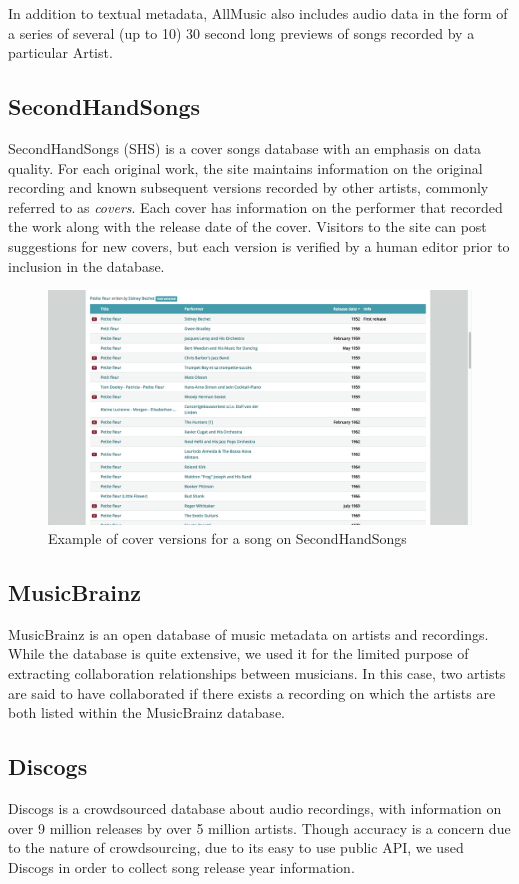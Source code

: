 In addition to textual metadata, AllMusic also includes audio data in the form of a series of several (up to 10) 30 second long previews of songs recorded by a particular Artist. 

\subsection{SecondHandSongs}
SecondHandSongs (SHS) is a cover songs database with an emphasis on data quality. For each original work, the site maintains information on the original recording and known subsequent versions recorded by other artists, commonly referred to as \textit{covers}. Each cover has information on the performer that recorded the work along with the release date of the cover. Visitors to the site can post suggestions for new covers, but each version is verified by a human editor prior to inclusion in the database.

\begin{figure}[H]
\includegraphics[width=\textwidth]{figures/shs_example.png}
\caption{Example of cover versions for a song on SecondHandSongs}
\end{figure}

\subsection{MusicBrainz}
MusicBrainz is an open database of music metadata on artists and recordings. While the database is quite extensive, we used it for the limited purpose of extracting collaboration relationships between musicians. In this case, two artists are said to have collaborated if there exists a recording on which the artists are both listed within the MusicBrainz database.

\subsection{Discogs}
Discogs is a crowdsourced database about audio recordings, with information on over 9 million releases by over 5 million artists. Though accuracy is a concern due to the nature of crowdsourcing, due to its easy to use public API, we used Discogs in order to collect song release year information.

